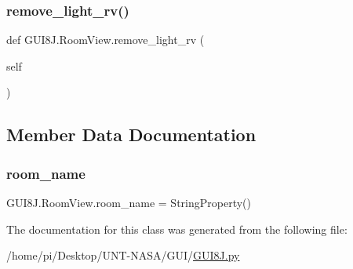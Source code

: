 \subsubsection{\texorpdfstring{remove\+\_\+light\+\_\+rv()}{remove\_light\_rv()}}
{\footnotesize\ttfamily def G\+U\+I8\+J.\+Room\+View.\+remove\+\_\+light\+\_\+rv (\begin{DoxyParamCaption}\item[{}]{self }\end{DoxyParamCaption})}



\subsection{Member Data Documentation}
\mbox{\label{classGUI8J_1_1RoomView_a08f244cc3d025a53e8b638c3916189e9}} 
\subsubsection{\texorpdfstring{room\+\_\+name}{room\_name}}
{\footnotesize\ttfamily G\+U\+I8\+J.\+Room\+View.\+room\+\_\+name = String\+Property()\hspace{0.3cm}{\ttfamily [static]}}



The documentation for this class was generated from the following file\+:\begin{DoxyCompactItemize}
\item 
/home/pi/\+Desktop/\+U\+N\+T-\/\+N\+A\+S\+A/\+G\+U\+I/\hyperlink{GUI8J_8py}{G\+U\+I8\+J.\+py}\end{DoxyCompactItemize}
